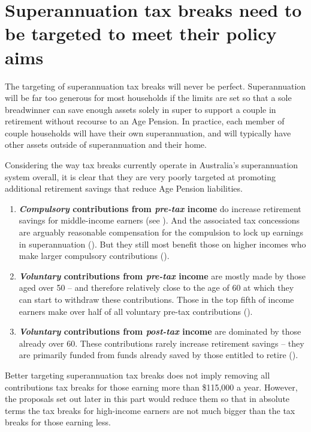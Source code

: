 \section{Superannuation tax breaks need to be targeted to meet their policy aims}\label{sec:SUPER-3-7}
The targeting of superannuation tax breaks will never be perfect. Superannuation will be far too generous for most households if the limits are set so that a sole breadwinner can save enough assets solely in super to support a couple in retirement without recourse to an Age Pension. In practice, each member of couple households will have their own superannuation, and will typically have other assets outside of superannuation and their home.

Considering the way tax breaks currently operate in Australia’s superannuation system overall, it is clear that they are very poorly targeted at promoting additional retirement savings that reduce Age Pension liabilities.

\begin{enumerate}
\renewcommand{\ULthickness}{0.66pt}
\renewcommand{\ULdepth}{0.7ex}
\newcommand{\outerbf}[1]{\textbf{#1}}
\newcommand{\emphbf}[1]{\textit{#1}}
\renewcommand{\labelenumi}{\textbf{\textcolor{Orange}{\arabic{enumi}.~}}}
\item \outerbf{\emphbf{Compulsory} contributions from \emphbf{pre-tax} income} do increase retirement savings for middle-income earners (see ). And the associated tax concessions are arguably reasonable compensation for the compulsion to lock up earnings in superannuation (). But they still most benefit those on higher incomes who make larger compulsory contributions ().
\item \outerbf{\emphbf{Voluntary} contributions from \emphbf{pre-tax} income} are mostly made by those aged over 50 – and therefore relatively close to the age of 60 at which they can start to withdraw these contributions. Those in the top fifth of income earners make over half of all voluntary pre-tax contributions (). 
\item \outerbf{\emphbf{Voluntary} contributions from \emphbf{post-tax} income} are dominated by those already over 60. These contributions rarely increase retirement savings – they are primarily funded from funds already saved by those entitled to retire (). 
\end{enumerate}


Better targeting superannuation tax breaks does not imply removing all contributions tax breaks for those earning more than \$115,000 a year. However, the proposals set out later in this part would reduce them so that in absolute terms the tax breaks for high-income earners are not much bigger than the tax breaks for those earning less. 

